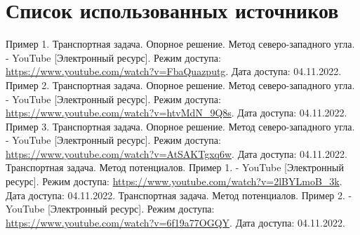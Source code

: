 \newpage

\begingroup
  \section*{Список использованных источников}

  \renewcommand{\addcontentsline}[3]{}%
  \renewcommand{\section}[2]{}%

  \begin{thebibliography}{}
    Пример 1. Транспортная задача. Опорное решение. Метод северо-западного угла. - YouTube
    [Электронный ресурс].
    Режим доступа: \url{https://www.youtube.com/watch?v=FbaQuazputg}.
    Дата доступа: 04.11.2022.
    Пример 2. Транспортная задача. Опорное решение. Метод северо-западного угла. - YouTube
    [Электронный ресурс].
    Режим доступа: \url{https://www.youtube.com/watch?v=htvMdN_9Q8s}.
    Дата доступа: 04.11.2022.
    Пример 3. Транспортная задача. Опорное решение. Метод северо-западного угла. - YouTube
    [Электронный ресурс].
    Режим доступа: \url{https://www.youtube.com/watch?v=AtSAKTgxq6w}.
    Дата доступа: 04.11.2022.
    Транспортная задача. Метод потенциалов. Пример 1. - YouTube
    [Электронный ресурс].
    Режим доступа: \url{https://www.youtube.com/watch?v=2lBYLmoB_3k}.
    Дата доступа: 04.11.2022.
    Транспортная задача. Метод потенциалов. Пример 2. - YouTube
    [Электронный ресурс].
    Режим доступа: \url{https://www.youtube.com/watch?v=6f19a77OGQY}.
    Дата доступа: 04.11.2022.
  \end{thebibliography}
\endgroup

\newpage

\begingroup
  \section*{Литература, чтобы писать в \LaTeX}
  \addcontentsline{toc}{section}{Литература, чтобы писать в LaTeX}

